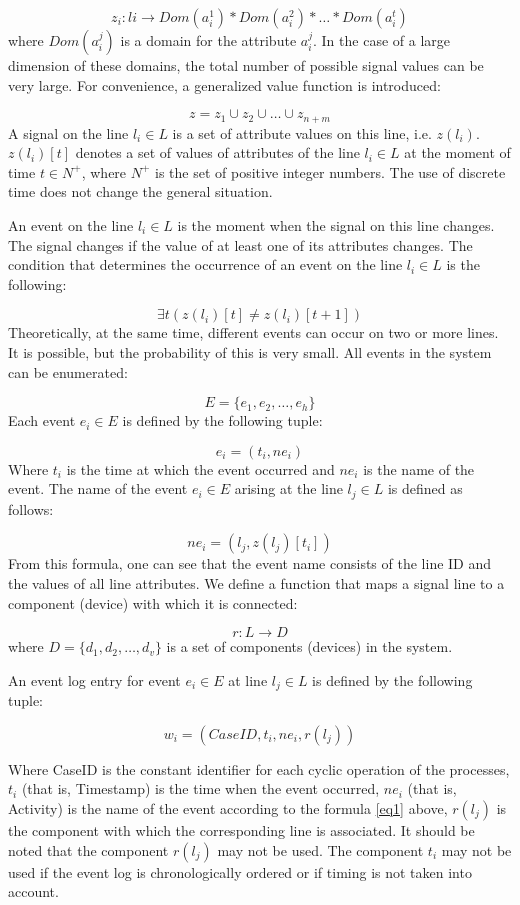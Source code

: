 \begin{bibunit}
\[ z_i: li\rightarrow Dom(a_i^1) * Dom(a_i^2) * \dots * Dom(a_i^t) \]
where $ Dom(a_i^j) $ is a domain for the attribute  $ a_i^j $. 
In the case of a large dimension of these domains, the total number of possible signal values can be very large. For convenience, a generalized value function is introduced: 

\[ z=z_1 \cup z_2 \cup \dots \cup z_{n+m}  \]
A signal on the line $ l_i \in L$ is a set of attribute values on this line, i.e. $z(l_i)$.
$z(l_i)[t]$ denotes a set of values of attributes of the line $ l_i \in L$ at the moment of time $ t \in  N^+ $, where $N^+ $ is the set of positive integer numbers. The use of  discrete time does not change the general situation. 

An event on the line $ l_i \in L$ is the moment when the signal on this line changes. The signal changes if the value of at least one of its attributes changes. The condition that determines the occurrence of an event on the line  $ l_i \in L$ is the following: 


\[ \exists t (z(l_i)[t] \ne z(l_i)[t+1]) \]
Theoretically, at the same time, different events can occur on two or more lines. It is possible, but the probability of this is very small. All events in the system can be enumerated: 


\[ E=\{e_1,e_2,\dots, e_h\} \]
Each event $ e_i \in E  $ is defined by the following tuple:

\[ e_i = (t_i, ne_i) \]
Where $t_i$ is the time at which the event occurred and $ne_i$ is the name of the event. The name of the event $e_i \in E $ arising   at the line $l_j \in L$ is defined as follows:

\begin{equation} \label{eq1}
   ne_i = (l_j,z(l_j)[t_i]) 
\end{equation}   
From this formula, one can see that the event name consists of the line ID and the values of all line attributes. We define a function that maps a signal line to a component (device) with which it is connected: 

\[ r : L \rightarrow D \] 
where $ D=\{d_1,d_2,\dots, d_v\} $ is a set of components (devices) in the system. 

An event log entry for event $ e_i \in E $ at line  $ l_j \in L$ is defined by the following tuple: 

\[  w_i= (CaseID, t_i, ne_i, r(l_j)) \]

Where CaseID is the constant identifier for each cyclic operation of the processes, $t_i$ (that is, Timestamp) is the time when the event occurred, $ne_i$ (that is, Activity) is the name of the event according to the formula \ref{eq1} above, $r(l_j)$ is the component with which the corresponding line is associated.  It should be noted that the component $r(l_j)$ may not be used. The component $t_i$ may not be used if the event log is chronologically ordered or if timing is not taken into account.

\end{bibunit}
